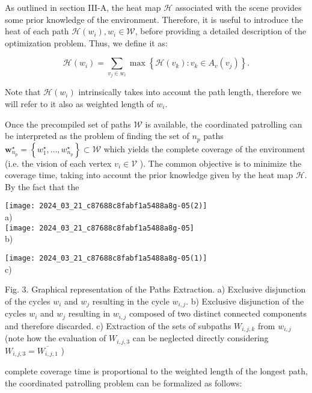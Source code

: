 \documentclass[conference]{IEEEtran}
\begin{document}
As outlined in section III-A, the heat map $\mathcal{H}$ associated with the scene provides some prior knowledge of the environment. Therefore, it is useful to introduce the heat of each path $\mathcal{H}\left(w_{i}\right), w_{i} \in \mathcal{W}$, before providing a detailed description of the optimization problem. Thus, we define it as:


\begin{equation*}
\mathcal{H}\left(w_{i}\right)=\sum_{v_{j} \in w_{i}} \max \left\{\mathcal{H}\left(v_{k}\right): v_{k} \in A_{v}\left(v_{j}\right)\right\} . \tag{3}
\end{equation*}


Note that $\mathcal{H}\left(w_{i}\right)$ intrinsically takes into account the path length, therefore we will refer to it also as weighted length of $w_{i}$.

Once the precompiled set of paths $\mathcal{W}$ is available, the coordinated patrolling can be interpreted as the problem of finding the set of $n_{p}$ paths $\mathbf{w}_{n_{p}}^{\star}=\left\{w_{1}^{\star}, \ldots, w_{n_{p}}^{\star}\right\} \subset \mathcal{W}$ which yields the complete coverage of the environment (i.e. the vision of each vertex $v_{i} \in \mathcal{V}$ ). The common objective is to minimize the coverage time, taking into account the prior knowledge given by the heat map $\mathcal{H}$. By the fact that the

\texttt{[image: 2024\_03\_21\_c87688c8fabf1a5488a8g-05(2)]}\\
a)\\
\texttt{[image: 2024\_03\_21\_c87688c8fabf1a5488a8g-05]}\\
b)

\texttt{[image: 2024\_03\_21\_c87688c8fabf1a5488a8g-05(1)]}\\
c)

Fig. 3. Graphical representation of the Paths Extraction. a) Exclusive disjunction of the cycles $w_{i}$ and $w_{j}$ resulting in the cycle $w_{i, j}$. b) Exclusive disjunction of the cycles $w_{i}$ and $w_{j}$ resulting in $w_{i, j}$ composed of two distinct connected components and therefore discarded. c) Extraction of the sets of subpaths $W_{i, j, k}$ from $w_{i, j}$ (note how the evaluation of $W_{i, j, 3}$ can be neglected directly considering $W_{i, j, 3}=\overline{W_{i, j, 1}}$ )

complete coverage time is proportional to the weighted length of the longest path, the coordinated patrolling problem can be formalized as follows:
\end{document}
